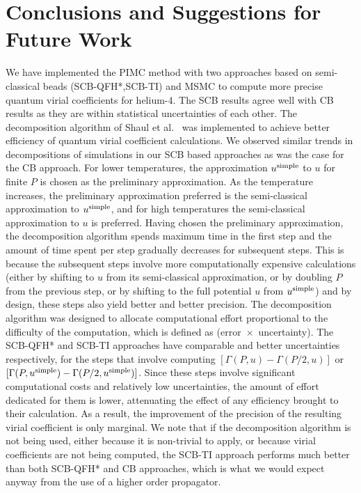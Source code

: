 \chapter{Conclusions and Suggestions for Future Work}

We have implemented the PIMC method with two approaches based on semi-classical beads (SCB-QFH*,SCB-TI) and MSMC to compute more precise quantum virial coefficients for helium-4. The SCB results agree well with CB results as they are within statistical uncertainties of each other. The decomposition algorithm of Shaul et al.~\cite{Shaul2012} was implemented to achieve better efficiency of quantum virial coefficient calculations. We observed similar trends in decompositions of simulations in our SCB based approaches as was the case for the CB approach. For lower temperatures, the approximation $u^{\rm simple}$ to $u$ for finite $P$ is chosen as the preliminary approximation. As the temperature increases, the preliminary approximation preferred is the semi-classical approximation to $u^{\rm simple}$, and for high temperatures the semi-classical approximation to $u$ is preferred. Having chosen the preliminary approximation, the decomposition algorithm spends maximum time in the first step and the amount of time spent per step gradually decreases for subsequent steps. This is because the subsequent steps involve more computationally expensive calculations (either by shifting to $u$ from its semi-classical approximation, or by doubling $P$ from the previous step, or by shifting to the full potential $u$ from $u^{\rm simple}$) and by design, these steps also yield better and better precision. The decomposition algorithm was designed to allocate computational effort proportional to the difficulty of the computation, which is defined as (error~$\times$~uncertainty). The SCB-QFH* and SCB-TI approaches have comparable and better uncertainties respectively, for the steps that involve computing $[\Gamma(P,u) - \Gamma(P/2,u)]$ or $[\Gamma(P,u^{\rm simple}) - \Gamma(P/2,u^{\rm simple})]$. Since these steps involve significant computational costs and relatively low uncertainties, the amount of effort dedicated for them is lower, attenuating the effect of any efficiency brought to their calculation. As a result, the improvement of the precision of the resulting virial coefficient is only marginal. We note that if the decomposition algorithm is not being used, either because it is non-trivial to apply, or because virial coefficients are not being computed, the SCB-TI approach performs much better than both SCB-QFH* and CB approaches, which is what we would expect anyway from the use of a higher order propagator.


